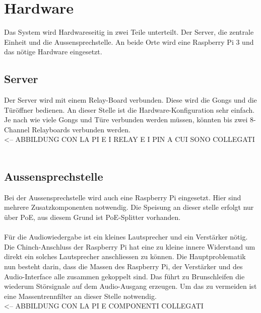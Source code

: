 \section{Hardware}
\label{sec:chapterexample}

Das System wird Hardwareseitig in zwei Teile unterteilt. Der Server, die zentrale Einheit und die Aussensprechstelle. An beide Orte wird eine Raspberry Pi 3 und das nötige Hardware eingesetzt.

\subsection{Server}
\label{sec:chapterexample}

Der Server wird mit einem Relay-Board verbunden. Diese wird die Gongs und die Türöffner bedienen. An dieser Stelle ist die Hardware-Konfiguration sehr einfach. Je nach wie viele Gongs und Türe verbunden werden müssen, könnten bis zwei 8-Channel Relayboards verbunden werden.
\\

<-- ABBILDUNG CON LA PI E I RELAY E I PIN A CUI SONO COLLEGATI
\\
\\

\subsection{Aussensprechstelle}
\label{sec:chapterexample}

Bei der Aussensprechstelle wird auch eine Raspberry Pi eingesetzt. Hier sind mehrere Zusatzkomponenten notwendig. Die Speisung an dieser stelle erfolgt nur über PoE, aus diesem Grund ist PoE-Splitter vorhanden.
\\
\\
Für die Audiowiedergabe ist ein kleines Lautsprecher und ein Verstärker nötig. Die Chinch-Anschluss der Raspberry Pi hat eine zu kleine innere Widerstand um direkt ein solches Lautsprecher anschliessen zu können. Die Hauptproblematik nun besteht darin, dass die Massen des Raspberry Pi, der Verstärker und des Audio-Interface alle zusammen gekoppelt sind. Das führt zu Brunschleifen die wiederum Störsignale auf dem Audio-Ausgang erzeugen. Um das zu vermeiden ist eine Massentrennfilter an dieser Stelle notwendig.
\\

<-- ABBILDUNG CON LA PI E COMPONENTI COLLEGATI
\\
\\


